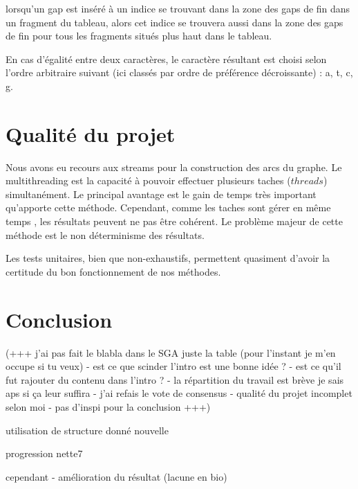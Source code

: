 \documentclass{article}
\begin{document}
 lorsqu'un gap est inséré à un indice se trouvant dans la zone des gaps de fin dans un fragment du tableau, alors cet indice se trouvera aussi dans la zone des gaps de fin pour tous les fragments situés plus haut dans le tableau. 

En cas d'égalité entre deux caractères, le caractère résultant est choisi selon l'ordre arbitraire suivant (ici classés par ordre de préférence décroissante) : a, t, c, g.

\section{Qualité du projet}

Nous avons eu recours aux streams pour la construction des arcs du graphe. Le multithreading est la capacité à pouvoir effectuer plusieurs taches ($threads$) simultanément. Le principal avantage est le gain de temps très important qu'apporte cette méthode. Cependant, comme les taches sont gérer en même temps , les résultats peuvent ne pas être cohérent. Le problème majeur de cette méthode est le non déterminisme des résultats.

Les tests unitaires, bien que non-exhaustifs, permettent quasiment d'avoir la certitude du bon fonctionnement de nos méthodes.



\section{Conclusion}

(+++ j'ai pas fait le blabla dans le SGA juste la table (pour l'instant je m'en occupe si tu veux)  - est ce que scinder l'intro est une bonne idée ? - est ce qu'il fut rajouter du contenu dans l'intro ? -  la répartition du travail est brève je sais aps si ça leur suffira -  j'ai refais le vote de consensus -  qualité du projet incomplet selon moi - pas d'inspi pour la conclusion +++)

utilisation de structure donné nouvelle

progression nette7

cependant - amélioration du résultat (lacune en bio)
\end{document}
